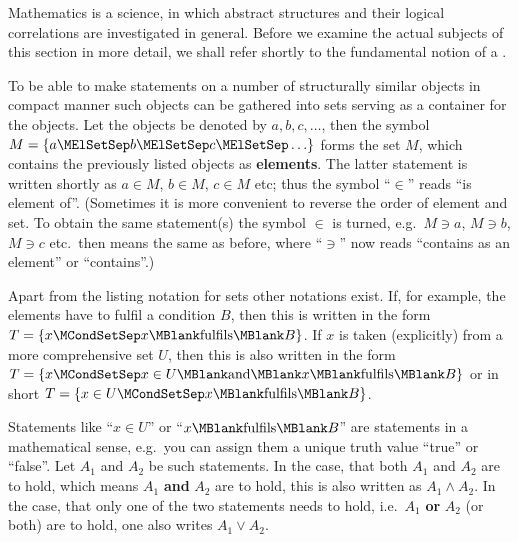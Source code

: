 \begin{MIntro}

Mathematics is a science, in which abstract structures and their logical correlations are investigated in general. 
Before we examine the actual subjects of this section in more detail, we shall refer shortly to the fundamental 
notion of a . 

\begin{MInfo}
To be able to make statements on a number of structurally similar objects in compact manner such objects 
can be gathered into sets serving as a container for the objects. Let the objects be denoted by $a,b,c,\ldots$, 
then the symbol $M=\{a\MElSetSep b \MElSetSep c \MElSetSep \ldots\}$ forms the set $M$, which contains the previously 
listed objects as \textbf{elements}. The latter statement is written shortly as $a\in M$, $b\in M$, $c\in M$ etc; thus the symbol 
``$\in$'' reads ``is element of''. (Sometimes it is more convenient to reverse the order of element 
and set. To obtain the same statement(s) the symbol $\in$ is turned, e.g.\ $M\ni a$, $M\ni b$, $M\ni c$ etc.\ then 
means the same as before, where ``$\ni$'' now reads ``contains as an element'' or 
``contains''.) 

Apart from the listing notation for sets other notations exist. If, for example, the elements have to fulfil a 
condition $B$, then this is written in the form $T=\{x\MCondSetSep x\MBlank\text{fulfils}\MBlank B\}$. If $x$ is taken (explicitly) from a 
more comprehensive set $U$, then this is also written in the form $T=\{x\MCondSetSep x\in U \MBlank\text{and}\MBlank 
x\MBlank\text{fulfils}\MBlank B\}$ or in short $T=\{x\in U\MCondSetSep x\MBlank\text{fulfils}\MBlank B\}$.

Statements like ``$x\in U$'' or ``$x\MBlank\text{fulfils}\MBlank B$'' are statements in a 
mathematical sense, e.g.\ you can assign them a unique truth value ``true'' or ``false''. 
Let $A_1$ and $A_2$ be such statements. In the case, that both $A_1$ and $A_2$ are to hold, which means $A_1$ 
\textbf{and} $A_2$ are to hold, this is also written as $A_1 \wedge A_2$. In the case, that only one of the two 
statements needs to hold, i.e.\ $A_1$ \textbf{or} $A_2$ (or both) are to hold, one also writes $A_1\vee A_2$.


\end{MInfo}
\end{MIntro}
